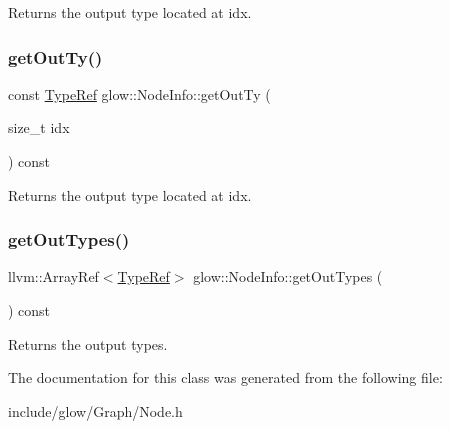 \begin{DoxyReturn}{Returns}
the output type located at {\ttfamily idx}. 
\end{DoxyReturn}
\mbox{\label{classglow_1_1_node_info_a3a315e1307eb6c1114174e98f60d7232}} 
\subsubsection{\texorpdfstring{get\+Out\+Ty()}{getOutTy()}}
{\footnotesize\ttfamily const \hyperlink{structglow_1_1_type}{Type\+Ref} glow\+::\+Node\+Info\+::get\+Out\+Ty (\begin{DoxyParamCaption}\item[{size\+\_\+t}]{idx }\end{DoxyParamCaption}) const\hspace{0.3cm}{\ttfamily [inline]}}

\begin{DoxyReturn}{Returns}
the output type located at {\ttfamily idx}. 
\end{DoxyReturn}
\mbox{\label{classglow_1_1_node_info_a0054dece1b1c57116ddb4fe7d5749cc7}} 
\subsubsection{\texorpdfstring{get\+Out\+Types()}{getOutTypes()}}
{\footnotesize\ttfamily llvm\+::\+Array\+Ref$<$\hyperlink{structglow_1_1_type}{Type\+Ref}$>$ glow\+::\+Node\+Info\+::get\+Out\+Types (\begin{DoxyParamCaption}{ }\end{DoxyParamCaption}) const\hspace{0.3cm}{\ttfamily [inline]}}

\begin{DoxyReturn}{Returns}
the output types. 
\end{DoxyReturn}


The documentation for this class was generated from the following file\+:\begin{DoxyCompactItemize}
\item 
include/glow/\+Graph/Node.\+h\end{DoxyCompactItemize}
